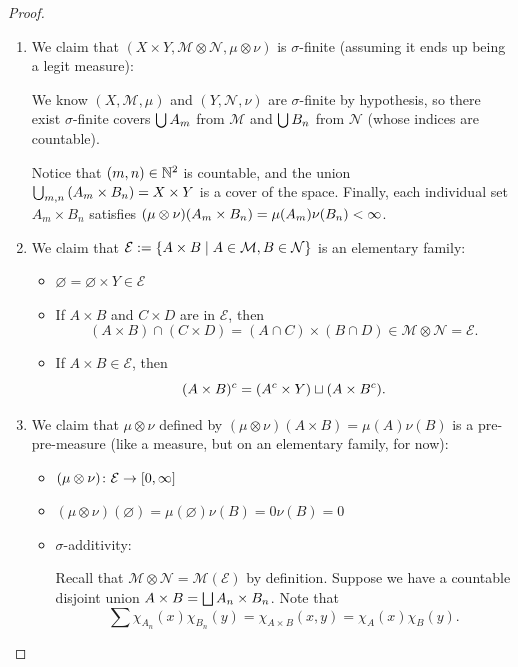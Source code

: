 \documentclass[11pt,leqno,oneside]{amsbook}
\numberwithin{thm}{section}
\newcommand{\M}{\mathcal{M}}
\newcommand{\E}{\mathcal{E}}
\newcommand{\cN}{\mathcal{N}}
\newcommand{\s}{$\sigma$-} %
\newcommand{\x}{\times}
\newcommand{\ox}{\otimes}
\renewcommand{\emptyset}{\varnothing}
\begin{document}
\begin{proof}
  \mbox{}
  \begin{enumerate}[label=(\arabic{*})]
    \item We claim that $(X \x Y, \M \ox \cN, \mu \ox \nu)$ is \s finite (assuming it ends up being a legit measure):

    We know $(X, \M, \mu)$ and $(Y, \cN, \nu)$ are \s finite by hypothesis, so there exist \s finite covers $\bigcup A_m$ from $\M$ and $\bigcup B_n$ from $\cN$ (whose indices are countable).

    Notice that $(m, n) \in {\mathbb N}^2$ is countable, and the union $\Union_{m,n}\left(A_m \x B_n\right) = X \x Y$ is a cover of the space.  Finally, each individual set $A_m \x B_n$ satisfies $(\mu\ox\nu)(A_m \x B_n) = \mu(A_m)\nu(B_n) < \oo$.

    \item We claim that $\E := \{A \x B \st A \in \M, B \in \cN\}$ is an elementary family:

    \begin{itemize}
      \item $\emptyset = \emptyset \x Y \in \E$
      \item If $A \x B$ and $C \x D$ are in $\E$, then $$(A \x B) \cap (C \x D) = (A \cap C) \x (B \cap D) \in \M \ox \cN = \E.$$
      \item If $A \x B \in \E$, then $$(A \x B)^c = (A^c \x Y) \dunion (A \x B^c).$$
    \end{itemize}

    \item We claim that $\mu \ox \nu$ defined by $(\mu\ox\nu)(A \x B) = \mu(A)\nu(B)$ is a pre-pre-measure (like a measure, but on an elementary family, for now):

    \begin{itemize}
      \item $(\mu\ox\nu)\from\E\to[0, \oo]$
      \item $(\mu\ox\nu)(\emptyset) = \mu(\emptyset)\nu(B) = 0\nu(B) = 0$
      \item \s additivity:

      Recall that $\M \ox \cN = \M(\E)$ by definition.  Suppose we have a countable disjoint union $A \x B = \Dunion A_n \x B_n$.  Note that
      $$\sum \chi_{A_n}(x)\chi_{B_n}(y) = \chi_{A \x B}(x,y) = \chi_A(x)\chi_B(y).$$


\end{itemize}
\end{enumerate}
\end{proof}
\end{document}
